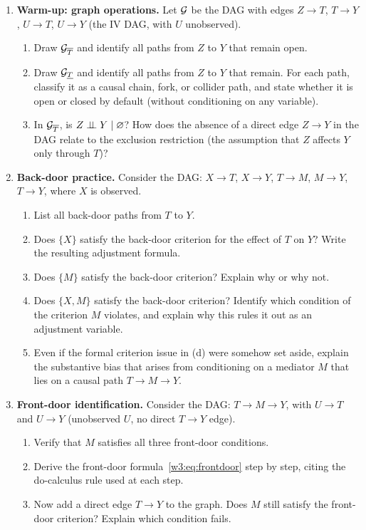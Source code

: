 \documentclass[master.tex]{subfiles}
\begin{document}
\begin{enumerate}[label=\textbf{\arabic*.}, leftmargin=*, itemsep=10pt]

  \item \textbf{Warm-up: graph operations.}
  Let $\mathcal{G}$ be the DAG with edges $Z \to T$, $T \to Y$, $U \to T$,
  $U \to Y$ (the IV DAG, with $U$ unobserved).
  \begin{enumerate}[label=(\alph*)]
    \item Draw $\mathcal{G}_{\overline{T}}$ and identify all paths from $Z$ to
          $Y$ that remain open.
    \item Draw $\mathcal{G}_{\underline{T}}$ and identify all paths from $Z$ to
          $Y$ that remain.  For each path, classify it as a causal chain,
          fork, or collider path, and state whether it is open or closed
          by default (without conditioning on any variable).
    \item In $\mathcal{G}_{\overline{T}}$, is $Z \perp\!\!\!\perp Y \mid \varnothing$?
          How does the absence of a direct edge $Z \to Y$ in the DAG
          relate to the exclusion restriction (the assumption that $Z$
          affects $Y$ only through $T$)?
  \end{enumerate}

  \item \textbf{Back-door practice.}
  Consider the DAG: $X \to T$, $X \to Y$, $T \to M$, $M \to Y$,
  $T \to Y$, where $X$ is observed.
  \begin{enumerate}[label=(\alph*)]
    \item List all back-door paths from $T$ to $Y$.
    \item Does $\{X\}$ satisfy the back-door criterion for the effect of
          $T$ on $Y$?  Write the resulting adjustment formula.
    \item Does $\{M\}$ satisfy the back-door criterion?  Explain why or
          why not.
    \item Does $\{X, M\}$ satisfy the back-door criterion?  Identify
          which condition of the criterion $M$ violates, and explain why
          this rules it out as an adjustment variable.
    \item Even if the formal criterion issue in (d) were somehow set aside,
          explain the substantive bias that arises from conditioning on a
          mediator $M$ that lies on a causal path $T \to M \to Y$.
  \end{enumerate}

  \item \textbf{Front-door identification.}
  Consider the DAG: $T \to M \to Y$, with $U \to T$ and $U \to Y$
  (unobserved $U$, no direct $T \to Y$ edge).
  \begin{enumerate}[label=(\alph*)]
    \item Verify that $M$ satisfies all three front-door conditions.
    \item Derive the front-door formula~\eqref{w3:eq:frontdoor} step by
          step, citing the do-calculus rule used at each step.
    \item Now add a direct edge $T \to Y$ to the graph.  Does $M$ still
          satisfy the front-door criterion?  Explain which condition fails.
  \end{enumerate}


\end{enumerate}
\end{document}
